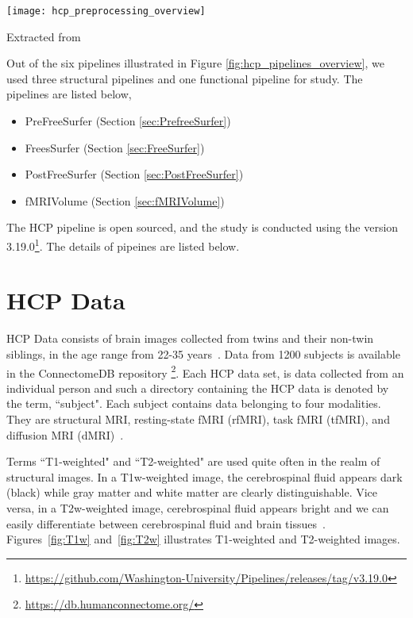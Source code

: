 \begin{center}
   \texttt{[image: hcp\_preprocessing\_overview]}
   \label{fig:hcp_pipelines_overview}
   \caption*{Extracted from \cite{Gla13}}
\end{center}

Out of the six pipelines illustrated in Figure \ref{fig:hcp_pipelines_overview}, we used three structural pipelines and one functional pipeline for study. The pipelines are listed below,
\begin{itemize}
  \item PreFreeSurfer (Section \ref{sec:PrefreeSurfer})
  \item FreesSurfer   (Section \ref{sec:FreeSurfer})
  \item PostFreeSurfer (Section \ref{sec:PostFreeSurfer})
  \item fMRIVolume    (Section \ref{sec:fMRIVolume})
\end{itemize}

The HCP pipeline is open sourced, and the study is conducted using the version 3.19.0\footnote{\url{https://github.com/Washington-University/Pipelines/releases/tag/v3.19.0}}. The details of pipeines are listed below.

\section{HCP Data} \label{HCP_Data}
HCP Data consists of brain images collected from twins and their non-twin siblings, in the age range from 22-35 years~\cite{HCPData}. Data from 1200 subjects is available in the ConnectomeDB repository \footnote{\url{https://db.humanconnectome.org/}}. Each HCP data set, is data collected from an individual person and such a directory containing the HCP data is denoted by the term, ``subject". Each subject contains data belonging to four modalities. They are structural MRI, resting-state fMRI (rfMRI), task fMRI (tfMRI), and diffusion MRI (dMRI)~\cite{HCPData}.

Terms ``T1-weighted" and ``T2-weighted" are used quite often in the realm of structural images. In a T1w-weighted image, the cerebrospinal fluid appears dark (black) while gray matter and white matter are clearly distinguishable. Vice versa, in a T2w-weighted image, cerebrospinal fluid appears bright and we can easily differentiate between cerebrospinal fluid and brain tissues~\cite{t1w_t2w}. Figures~\ref{fig:T1w} and~\ref{fig:T2w} illustrates T1-weighted and T2-weighted images.

